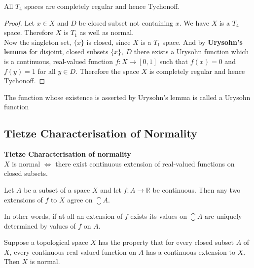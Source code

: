 \begin{corollary}
	All \( T_4 \) spaces are completely regular and hence Tychonoff.
\end{corollary}
\begin{proof}
	Let \( x \in X \) and \( D \) be closed subset not containing \( x \).
	We have \( X \) is a \( T_4 \) space.
	Therefore \( X \) is \( T_1 \) as well as normal.\\

	Now the singleton set, \( \{ x \} \) is closed, since \( X \) is a \( T_1 \) space.
	And by \textbf{Urysohn's lemma} for disjoint, closed subsets \( \{ x \},\ D \) there exists a Urysohn function which is a continuous, real-valued function \( f : X \to [0,1] \) such that \( f(x) = 0 \) and \( f(y) = 1 \) for all \( y \in D \).
	Therefore the space \( X \) is completely regular and hence Tychonoff.
\end{proof}

\begin{remark}
	The function whose existence is asserted by Urysohn's lemma is called a Urysohn function
\end{remark}

\subsection{Tietze Characterisation of Normality}
\begin{important}
	\textbf{Tietze Characterisation of normality}\\
	$X$ is normal $\iff$ there exist continuous extension of real-valued functions on closed subsets. 
\end{important}
\begin{proposition}
	Let \( A \) be a subset of a space \( X \) and let \( f : A \to \mathbb{R} \) be continuous.
	Then any two extensions of \( f \) to \( X \) agree on \( \closure{A} \).
	\begin{commentary}
		In other words, if at all an extension of \( f \) exists its values on \( \closure{A} \) are uniquely determined by values of \( f \) on \( A \).
	\end{commentary}
\end{proposition}

\begin{proposition}
	Suppose a topological space \( X \) has the property that for every closed subset \( A \) of \( X \), every continuous real valued function on \( A \) has a continuous extension to \( X \).
	Then \( X \) is normal.
\end{proposition}

